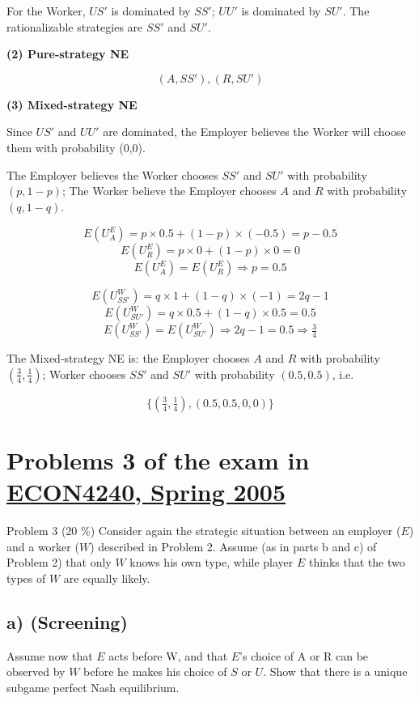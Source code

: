 \documentclass{article}
\begin{document}
For the Worker, $US'$ is dominated by $SS'$; $UU'$ is dominated by $SU'$. The rationalizable strategies are $SS'$ and $SU'$.

\medskip

\textbf{(2) Pure-strategy NE}

$$(A,SS'),(R,SU')$$

\smallskip

\textbf{(3) Mixed-strategy NE}

\medskip

Since $US'$ and $UU'$ are dominated, the Employer believes the Worker will choose 
them with probability (0,0).

\medskip

The Employer believes the Worker chooses $SS'$ and $SU'$ with probability $(p,1-p)$;
The Worker believe the Employer chooses $A$ and $R$ with probability $(q,1-q)$.

$$E(U^E_A) = p \times 0.5 + (1-p) \times (-0.5) = p-0.5$$
$$E(U^E_R) = p \times 0 + (1-p) \times 0 = 0$$
$$E(U^E_A) = E(U^E_R) \Rightarrow p=0.5$$


$$E(U^W_{SS'}) = q \times 1 + (1-q) \times (-1) = 2q-1$$
$$E(U^W_{SU'}) = q \times 0.5 + (1-q) \times 0.5 = 0.5$$
$$E(U^W_{SS'}) = E(U^W_{SU'}) \Rightarrow 2q-1=0.5 \Rightarrow \tfrac34$$

The Mixed-strategy NE is: the Employer chooses $A$ and $R$ with probability $(\tfrac34,\tfrac14)$; Worker chooses $SS'$ and $SU'$ with probability $(0.5,0.5)$, i.e.

$$\{(\tfrac34,\tfrac14), (0.5,0.5,0,0)\}$$


\section{Problems 3  of the exam in \href{https://www.uio.no/studier/emner/sv/oekonomi/ECON4240/previous-exams/}{ECON4240, Spring 2005}}

Problem 3 (20 \%)
Consider again the strategic situation between an employer ($E$) and a worker ($W$) described in
Problem 2. Assume (as in parts b and c) of Problem 2) that only $W$ knows his own type, while
player $E$ thinks that the two types of $W$ are equally likely.

\subsection*{a) (Screening)} Assume now that $E$ acts before W, and that $E$'s choice of A or R can be
observed by $W$ before he makes his choice of $S$ or $U$. Show that there is a unique
subgame perfect Nash equilibrium.
\end{document}
